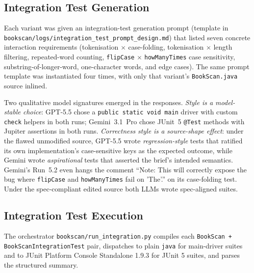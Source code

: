 \documentclass[journal]{IEEEtran}
\begin{document}
\subsection{Integration Test Generation}
\label{sec:p2integen}

Each variant was given an integration-test generation prompt
(template in
\texttt{bookscan/logs/integration\_test\_prompt\_design.md})
that listed seven concrete interaction requirements
(tokenisation $\times$ case-folding, tokenisation $\times$
length filtering, repeated-word counting, \texttt{flipCase}
$\times$ \texttt{howManyTimes} case sensitivity,
substring-of-longer-word, one-character words, and edge cases).
The same prompt template was instantiated four times, with
only that variant's \texttt{BookScan.java} source inlined.

Two qualitative model signatures emerged in the responses.
\emph{Style is a model-stable choice}: GPT-5.5 chose a
\texttt{public static void main} driver with custom
\texttt{check} helpers in both runs; Gemini~3.1~Pro chose
JUnit~5 \texttt{@Test} methods with Jupiter assertions in both
runs. \emph{Correctness style is a source-shape effect}: under
the flawed unmodified source, GPT-5.5 wrote
\emph{regression-style} tests that ratified its own
implementation's case-sensitive keys as the expected outcome,
while Gemini wrote \emph{aspirational} tests that asserted the
brief's intended semantics. Gemini's Run~5.2 even hangs the
comment ``Note: This will correctly expose the bug where
\texttt{flipCase} and \texttt{howManyTimes} fail on 'The'.''
on its case-folding test. Under the spec-compliant edited
source both LLMs wrote spec-aligned suites.

\subsection{Integration Test Execution}
\label{sec:p2intexec}

The orchestrator \texttt{bookscan/run\_integration.py}
compiles each \texttt{BookScan + BookScanIntegrationTest} pair,
dispatches to plain \texttt{java} for main-driver suites and
to JUnit Platform Console Standalone 1.9.3 for JUnit 5 suites,
and parses the structured summary.
\end{document}
